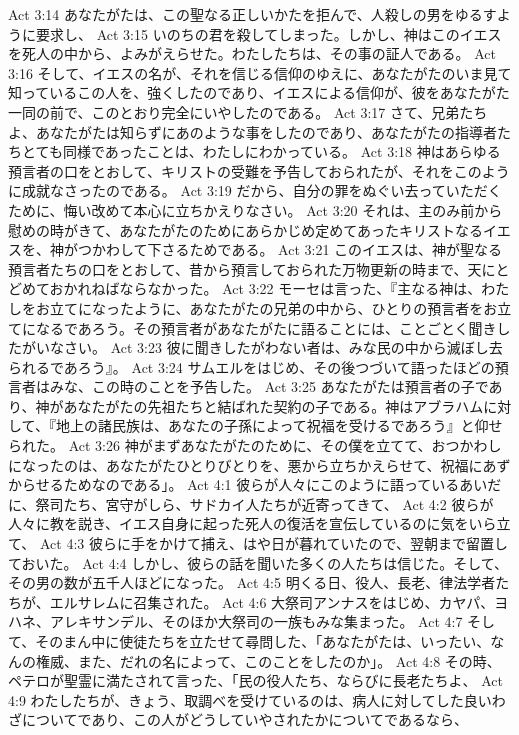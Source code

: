 Act 3:14  あなたがたは、この聖なる正しいかたを拒んで、人殺しの男をゆるすように要求し、
Act 3:15  いのちの君を殺してしまった。しかし、神はこのイエスを死人の中から、よみがえらせた。わたしたちは、その事の証人である。
Act 3:16  そして、イエスの名が、それを信じる信仰のゆえに、あなたがたのいま見て知っているこの人を、強くしたのであり、イエスによる信仰が、彼をあなたがた一同の前で、このとおり完全にいやしたのである。
Act 3:17  さて、兄弟たちよ、あなたがたは知らずにあのような事をしたのであり、あなたがたの指導者たちとても同様であったことは、わたしにわかっている。
Act 3:18  神はあらゆる預言者の口をとおして、キリストの受難を予告しておられたが、それをこのように成就なさったのである。
Act 3:19  だから、自分の罪をぬぐい去っていただくために、悔い改めて本心に立ちかえりなさい。
Act 3:20  それは、主のみ前から慰めの時がきて、あなたがたのためにあらかじめ定めてあったキリストなるイエスを、神がつかわして下さるためである。
Act 3:21  このイエスは、神が聖なる預言者たちの口をとおして、昔から預言しておられた万物更新の時まで、天にとどめておかれねばならなかった。
Act 3:22  モーセは言った、『主なる神は、わたしをお立てになったように、あなたがたの兄弟の中から、ひとりの預言者をお立てになるであろう。その預言者があなたがたに語ることには、ことごとく聞きしたがいなさい。
Act 3:23  彼に聞きしたがわない者は、みな民の中から滅ぼし去られるであろう』。
Act 3:24  サムエルをはじめ、その後つづいて語ったほどの預言者はみな、この時のことを予告した。
Act 3:25  あなたがたは預言者の子であり、神があなたがたの先祖たちと結ばれた契約の子である。神はアブラハムに対して、『地上の諸民族は、あなたの子孫によって祝福を受けるであろう』と仰せられた。
Act 3:26  神がまずあなたがたのために、その僕を立てて、おつかわしになったのは、あなたがたひとりびとりを、悪から立ちかえらせて、祝福にあずからせるためなのである」。
Act 4:1  彼らが人々にこのように語っているあいだに、祭司たち、宮守がしら、サドカイ人たちが近寄ってきて、
Act 4:2  彼らが人々に教を説き、イエス自身に起った死人の復活を宣伝しているのに気をいら立て、
Act 4:3  彼らに手をかけて捕え、はや日が暮れていたので、翌朝まで留置しておいた。
Act 4:4  しかし、彼らの話を聞いた多くの人たちは信じた。そして、その男の数が五千人ほどになった。
Act 4:5  明くる日、役人、長老、律法学者たちが、エルサレムに召集された。
Act 4:6  大祭司アンナスをはじめ、カヤパ、ヨハネ、アレキサンデル、そのほか大祭司の一族もみな集まった。
Act 4:7  そして、そのまん中に使徒たちを立たせて尋問した、「あなたがたは、いったい、なんの権威、また、だれの名によって、このことをしたのか」。
Act 4:8  その時、ペテロが聖霊に満たされて言った、「民の役人たち、ならびに長老たちよ、
Act 4:9  わたしたちが、きょう、取調べを受けているのは、病人に対してした良いわざについてであり、この人がどうしていやされたかについてであるなら、
